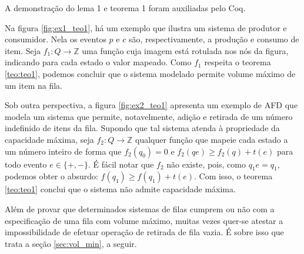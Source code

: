 A demonstração do lema 1 e teorema 1 foram auxiliadas pelo Coq.

Na figura \ref{fig:ex1_teo1}, há um exemplo que ilustra um sistema de produtor e consumidor. Nela os eventos $p$ e $c$ são, respectivamente, a produção e consumo de item. Seja $f_1 : Q \to \mathbb{Z}$ uma função cuja imagem está rotulada nos nós da figura, indicando para cada estado o valor mapeado. Como $f_1$ respeita o teorema \ref{teo:teo1}, podemos concluir que o sistema modelado permite volume máximo de um item na fila.


Sob outra perspectiva, a figura \ref{fig:ex2_teo1} apresenta um exemplo de AFD que modela um sistema que permite, notavelmente, adição e retirada de um número indefinido de itens da fila. Supondo que tal sistema atenda à propriedade da capacidade máxima, seja $f_2 : Q \to \mathbb{Z}$ qualquer função que mapeie cada estado a um número inteiro de forma que $f_2(q_0) = 0$ e $f_2(qe) \geq f_2(q) + t(e)$ para todo evento $e \in \{+,-\}$. É fácil notar que $f_2$ não existe, pois, como $q_1e = q_1$, podemos obter o absurdo: $f(q_1) \geq f(q_1) + t(e)$. Com isso, o teorema \ref{teo:teo1} conclui que o sistema não admite capacidade máxima.


Além de provar que determinados sistemas de filas cumprem ou não com a especificação de uma fila com volume máximo, muitas vezes quer-se atestar a impossibilidade de efetuar operação de retirada de fila vazia. É sobre isso que trata a seção \ref{sec:vol_min}, a seguir.

